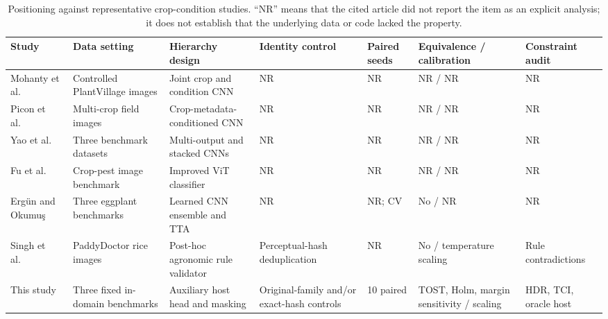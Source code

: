 \begin{table}[htbp]
\centering
\caption{Positioning against representative crop-condition studies. ``NR''
means that the cited article did not report the item as an explicit analysis;
it does not establish that the underlying data or code lacked the property.}
\label{tab:related-audit-comparison}
\scriptsize
\setlength{\tabcolsep}{2.5pt}
\begin{tabular}{@{}L{0.11\textwidth}L{0.13\textwidth}L{0.17\textwidth}
                    L{0.13\textwidth}L{0.07\textwidth}L{0.16\textwidth}
                    L{0.11\textwidth}@{}}
\toprule
Study & Data setting & Hierarchy design & Identity control & Paired seeds & Equivalence / calibration & Constraint audit\\
\midrule
Mohanty et al.\ \cite{mohanty2016} & Controlled PlantVillage images & Joint crop and condition CNN & NR & NR & NR / NR & NR\\
Picon et al.\ \cite{picon2019} & Multi-crop field images & Crop-metadata-conditioned CNN & NR & NR & NR / NR & NR\\
Yao et al.\ \cite{yao2024} & Three benchmark datasets & Multi-output and stacked CNNs & NR & NR & NR / NR & NR\\
Fu et al.\ \cite{fu2024} & Crop-pest image benchmark & Improved ViT classifier & NR & NR & NR / NR & NR\\
Erg\"un and Okumu\c{s} \cite{ergun2026} & Three eggplant benchmarks & Learned CNN ensemble and TTA & NR & NR; CV & No / NR & NR\\
Singh et al.\ \cite{singh2026} & PaddyDoctor rice images & Post-hoc agronomic rule validator & Perceptual-hash deduplication & NR & No / temperature scaling & Rule contradictions\\
This study & Three fixed in-domain benchmarks & Auxiliary host head and masking & Original-family and/or exact-hash controls & 10 paired & TOST, Holm, margin sensitivity / scaling & HDR, TCI, oracle host\\
\bottomrule
\end{tabular}
\end{table}

